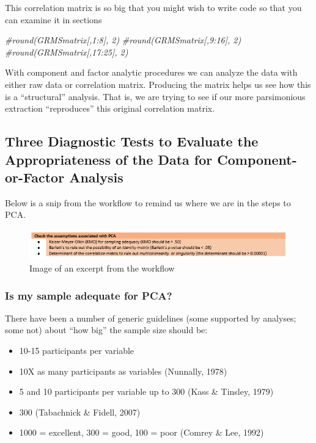 \documentclass[
  english,
]{book}
\newenvironment{Shaded}{\begin{snugshade}}{\end{snugshade}}
\newcommand{\CommentTok}[1]{\textcolor[rgb]{0.56,0.35,0.01}{\textit{#1}}}
\providecommand{\tightlist}{%
  \setlength{\itemsep}{0pt}\setlength{\parskip}{0pt}}
\begin{document}
This correlation matrix is so big that you might wish to write code so that you can examine it in sections

\begin{Shaded}
\begin{Highlighting}[]
\CommentTok{#round(GRMSmatrix[,1:8], 2)}
\CommentTok{#round(GRMSmatrix[,9:16], 2)}
\CommentTok{#round(GRMSmatrix[,17:25], 2)}
\end{Highlighting}
\end{Shaded}

With component and factor analytic procedures we can analyze the data with either raw data or correlation matrix. Producing the matrix helps us see how this is a ``structural'' analysis. That is, we are trying to see if our more parsimonious extraction ``reproduces'' this original correlation matrix.

\hypertarget{three-diagnostic-tests-to-evaluate-the-appropriateness-of-the-data-for-component-or-factor-analysis}{%
\subsection{Three Diagnostic Tests to Evaluate the Appropriateness of the Data for Component-or-Factor Analysis}\label{three-diagnostic-tests-to-evaluate-the-appropriateness-of-the-data-for-component-or-factor-analysis}}

Below is a snip from the workflow to remind us where we are in the steps to PCA.

\begin{figure}
\centering
\includegraphics{images/PCA/assumptions.png}
\caption{Image of an excerpt from the workflow}
\end{figure}

\hypertarget{is-my-sample-adequate-for-pca}{%
\subsubsection{Is my sample adequate for PCA?}\label{is-my-sample-adequate-for-pca}}

There have been a number of generic guidelines (some supported by analyses; some not) about ``how big'' the sample size should be:

\begin{itemize}
\tightlist
\item
  10-15 participants per variable
\item
  10X as many participants as variables (Nunnally, 1978)
\item
  5 and 10 participants per variable up to 300 (Kass \& Tinsley, 1979)
\item
  300 (Tabachnick \& Fidell, 2007)
\item
  1000 = excellent, 300 = good, 100 = poor (Comrey \& Lee, 1992)
\end{itemize}
\end{document}
